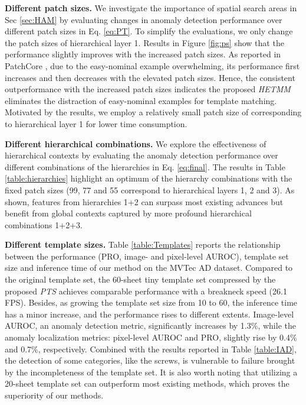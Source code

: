 \documentclass[default,iicol]{sn-jnl}\usepackage[algo2e,ruled,linesnumbered]{algorithm2e}
\theoremstyle{thmstyleone}\newtheorem{theorem}{Theorem}\newtheorem{proposition}[theorem]{Proposition}
\theoremstyle{thmstyletwo}\newtheorem{example}{Example}\newtheorem{remark}{Remark}
\theoremstyle{thmstylethree}\newtheorem{definition}{Definition}
\begin{document}
\noindent\textbf{Different patch sizes. }
We investigate the importance of spatial search areas in Sec \ref{sec:HAM} by evaluating changes in anomaly detection performance over different patch sizes in Eq. \ref{eq:PT}.
To simplify the evaluations, we only change the patch sizes of hierarchical layer 1.
Results in Figure \ref{fig:ps} show that the performance slightly improves with the increased patch sizes.
As reported in PatchCore \cite{patchcore}, due to the easy-nominal example overwhelming, its performance first increases and then decreases with the elevated patch sizes.
Hence, the consistent outperformance with the increased patch sizes indicates the proposed \textit{HETMM} eliminates the distraction of easy-nominal examples for template matching.
Motivated by the results, we employ a relatively small patch size of  corresponding to hierarchical layer 1 for lower time consumption.

\noindent\textbf{Different hierarchical combinations. }
We explore the effectiveness of hierarchical contexts by evaluating the anomaly detection performance over different combinations of the hierarchies in Eq. \ref{eq:final}.
The results in Table \ref{table:hierarchies} highlight an optimum of the hierarchy combinations with the fixed patch sizes (99, 77 and 55 correspond to hierarchical layers 1, 2 and 3).
As shown, features from hierarchies 1+2 can surpass most existing advances but benefit from global contexts captured by more profound hierarchical combinations 1+2+3.

\noindent\textbf{Different template sizes. }
Table \ref{table:Templates} reports the relationship between the performance (PRO, image- and pixel-level AUROC), template set size and inference time of our method on the MVTec AD dataset.
Compared to the original template set, the 60-sheet tiny template set compressed by the proposed \textit{PTS} achieves comparable performance with a breakneck speed (26.1 FPS).
Besides, as growing the template set size from 10 to 60, the inference time has a minor increase, and the performance rises to different extents.
Image-level AUROC, an anomaly detection metric, significantly increases by 1.3\%, while the anomaly localization metrics: pixel-level AUROC and PRO, slightly rise by 0.4\% and 0.7\%, respectively.
Combined with the results reported in Table \ref{table:IAD}, the detection of some categories, like the screws, is vulnerable to failure brought by the incompleteness of the template set.
It is also worth noting that utilizing a 20-sheet template set can outperform most existing methods, which proves the superiority of our methods.
\end{document}
